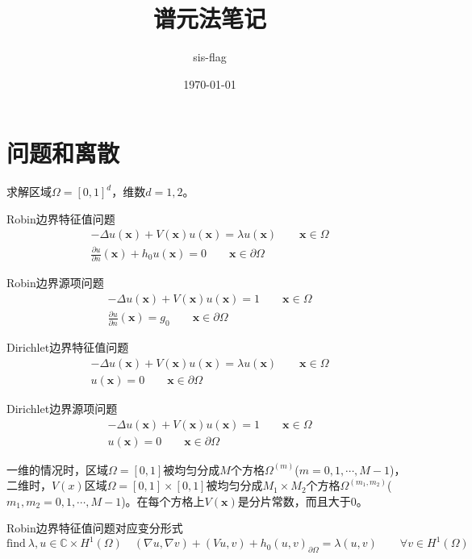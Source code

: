 \documentclass[UTF8,12pt]{article}
\title{谱元法笔记}
\author{sis-flag}
\date{\today}
\begin{document}
\maketitle

\section{问题和离散}

求解区域$\Omega = [0,1]^d$，维数$d = 1, 2$。

Robin边界特征值问题
\begin{eqnarray}
- \Delta u(\mathbf{x}) + V(\mathbf{x}) u(\mathbf{x}) = \lambda u(\mathbf{x}) \qquad \mathbf{x} \in \Omega \\
\frac{\partial u}{\partial n}(\mathbf{x}) + h_0 u(\mathbf{x}) = 0 \qquad \mathbf{x} \in \partial \Omega
\end{eqnarray}

Robin边界源项问题
\begin{eqnarray}
- \Delta u(\mathbf{x}) + V(\mathbf{x}) u(\mathbf{x}) = 1 \qquad \mathbf{x} \in \Omega \\
\frac{\partial u}{\partial n}(\mathbf{x}) = g_0 \qquad \mathbf{x} \in \partial \Omega
\end{eqnarray}

Dirichlet边界特征值问题
\begin{eqnarray}
- \Delta u(\mathbf{x}) + V(\mathbf{x}) u(\mathbf{x}) = \lambda u(\mathbf{x}) \qquad \mathbf{x} \in \Omega \\
u(\mathbf{x}) = 0 \qquad \mathbf{x} \in \partial \Omega
\end{eqnarray}

Dirichlet边界源项问题
\begin{eqnarray}
- \Delta u(\mathbf{x}) + V(\mathbf{x}) u(\mathbf{x}) = 1 \qquad \mathbf{x} \in \Omega \\
u(\mathbf{x}) = 0 \qquad \mathbf{x} \in \partial \Omega
\end{eqnarray}

一维的情况时，区域$\Omega=[0,1]$被均匀分成$M$个方格$\Omega^{(m)}$($m = 0, 1, \cdots, M-1$)，二维时，$V(x)$区域$\Omega=[0,1] \times [0,1]$被均匀分成$M_1 \times M_2$个方格$\Omega^{(m_1, m_2)}$($m_1, m_2 = 0, 1, \cdots, M-1$)。在每个方格上$V(\mathbf{x})$是分片常数，而且大于0。

Robin边界特征值问题对应变分形式
\begin{equation}
\text{find} \ \lambda, u \in \mathbb{C} \times H^1(\Omega) \quad (\nabla u, \nabla v) + (V u, v) + h_0 (u, v)_{\partial\Omega} = \lambda (u, v) \qquad \forall v \in  H^1(\Omega)
\end{equation}
\end{document}
